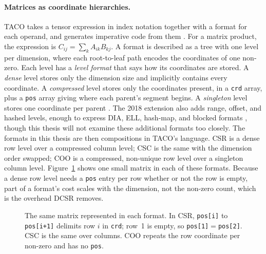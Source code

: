 \paragraph{Matrices as coordinate hierarchies.}
TACO takes a tensor expression in index notation together with a format for each operand, and generates imperative code from them \cite{taco}. For a matrix product, the
expression is $C_{ij} = \sum_k A_{ik}B_{kj}$. A format is described as a tree with one level per dimension, where each root-to-leaf path encodes the coordinates of one non-zero. Each level
has a \emph{level format} that says how its coordinates are stored. A \emph{dense} level stores only the dimension size and implicitly contains every coordinate. A \emph{compressed} level
stores only the coordinates present, in a \texttt{crd} array, plus a \texttt{pos} array giving where each parent's segment begins. A \emph{singleton} level stores one coordinate per parent
\cite{taco,taco_formats}. The 2018 extension also adds range, offset, and hashed levels, enough to express DIA, ELL, hash-map, and blocked formats \cite{taco_formats}, though this thesis will not examine these additional formats too closely.
The formats in this thesis are then compositions in TACO's language. CSR is a dense row level over a compressed column level; CSC is the same with the dimension order swapped; COO is a compressed, non-unique row level over a singleton column level. Figure~\ref{fig:taco-formats} shows one small matrix in each of these formats. Because a dense row level needs a \texttt{pos} entry per row
whether or not the row is empty, part of a format's cost scales with the dimension, not the non-zero count, which is the overhead DCSR removes.

\begin{figure}[t]
\centering
{}
\caption{The same matrix represented in each format. In CSR, \texttt{pos[i]} to \texttt{pos[i+1]} delimits row $i$ in \texttt{crd}; row~1 is empty, so \texttt{pos[1]}$=$\texttt{pos[2]}. CSC is the same over columns. COO repeats the row coordinate per non-zero and has no \texttt{pos}.}
\label{fig:taco-formats}
\end{figure}

